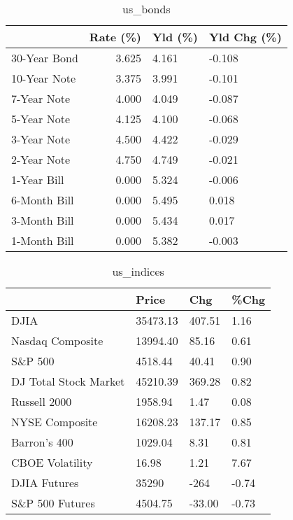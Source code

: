 \documentclass{article}%
\begin{document}
\begin{table}[htbp]%
\caption{us\_bonds}%
\centering%
\begin{adjustbox}{width=1\textwidth}%
\begin{tabular}{lrll}
\toprule
             &  Rate (\%) & Yld (\%) & Yld Chg (\%) \\
\midrule
30-Year Bond &     3.625 &   4.161 &      -0.108 \\
10-Year Note &     3.375 &   3.991 &      -0.101 \\
 7-Year Note &     4.000 &   4.049 &      -0.087 \\
 5-Year Note &     4.125 &   4.100 &      -0.068 \\
 3-Year Note &     4.500 &   4.422 &      -0.029 \\
 2-Year Note &     4.750 &   4.749 &      -0.021 \\
 1-Year Bill &     0.000 &   5.324 &      -0.006 \\
6-Month Bill &     0.000 &   5.495 &       0.018 \\
3-Month Bill &     0.000 &   5.434 &       0.017 \\
1-Month Bill &     0.000 &   5.382 &      -0.003 \\
\bottomrule
\end{tabular}
%
\end{adjustbox}%
\end{table}

%


\begin{table}[htbp]%
\caption{us\_indices}%
\centering%
\begin{adjustbox}{width=1\textwidth}%
\begin{tabular}{llll}
\toprule
                      &    Price &    Chg &  \%Chg \\
\midrule
                 DJIA & 35473.13 & 407.51 &  1.16 \\
     Nasdaq Composite & 13994.40 &  85.16 &  0.61 \\
              S\&P 500 &  4518.44 &  40.41 &  0.90 \\
DJ Total Stock Market & 45210.39 & 369.28 &  0.82 \\
         Russell 2000 &  1958.94 &   1.47 &  0.08 \\
       NYSE Composite & 16208.23 & 137.17 &  0.85 \\
         Barron's 400 &  1029.04 &   8.31 &  0.81 \\
      CBOE Volatility &    16.98 &   1.21 &  7.67 \\
         DJIA Futures &    35290 &   -264 & -0.74 \\
      S\&P 500 Futures &  4504.75 & -33.00 & -0.73 \\
\bottomrule
\end{tabular}
%
\end{adjustbox}%
\end{table}
\end{document}
